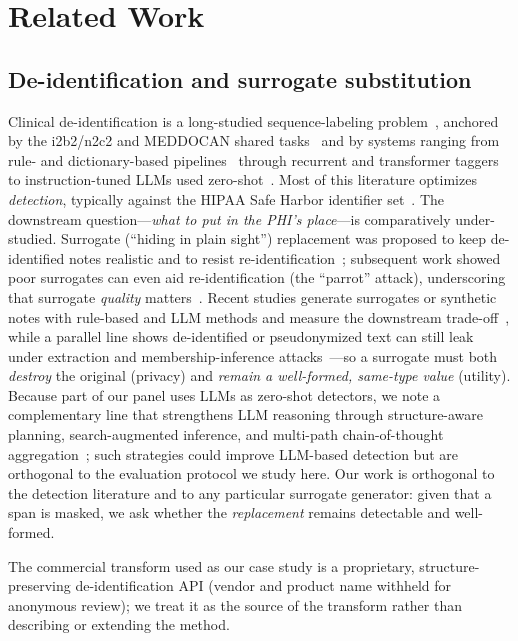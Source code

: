 \documentclass[pmlr,twocolumn,10pt]{jmlr}
\begin{document}
\section{Related Work}
\subsection{De-identification and surrogate substitution}
Clinical de-identification is a long-studied sequence-labeling problem~\citep{uzuner2007evaluating}, anchored by the i2b2/n2c2 and MEDDOCAN shared tasks~\citep{stubbs2015i2b2,marimon2019meddocan} and by systems ranging from rule- and dictionary-based pipelines~\citep{presidio} through recurrent and transformer taggers~\citep{dernoncourt2017deid,liu2017deid,johnson2020deid} to instruction-tuned LLMs used zero-shot~\citep{liu2023deidgpt}. Most of this literature optimizes \emph{detection}, typically against the HIPAA Safe Harbor identifier set~\citep{hhs2012safeharbor}. The downstream question---\emph{what to put in the PHI's place}---is comparatively under-studied. Surrogate (``hiding in plain sight'') replacement was proposed to keep de-identified notes realistic and to resist re-identification~\citep{carrell2013hiding}; subsequent work showed poor surrogates can even aid re-identification (the ``parrot'' attack), underscoring that surrogate \emph{quality} matters~\citep{carrell2020parrot}. Recent studies generate surrogates or synthetic notes with rule-based and LLM methods and measure the downstream trade-off~\citep{yermilov2023privacy,kim2024generalizing}, while a parallel line shows de-identified or pseudonymized text can still leak under extraction and membership-inference attacks~\citep{carlini2021extracting,lehman2021bert,sarkar2024deid}---so a surrogate must both \emph{destroy} the original (privacy) and \emph{remain a well-formed, same-type value} (utility). Because part of our panel uses LLMs as zero-shot detectors, we note a complementary line that strengthens LLM reasoning through structure-aware planning, search-augmented inference, and multi-path chain-of-thought aggregation~\citep{xiong2025deliberate,xiong2026enhancing,xiong2026adaptive,xiong2025enhancing}; such strategies could improve LLM-based detection but are orthogonal to the evaluation protocol we study here. Our work is orthogonal to the detection literature and to any particular surrogate generator: given that a span is masked, we ask whether the \emph{replacement} remains detectable and well-formed.

The commercial transform used as our case study is a proprietary, structure-preserving de-identification API (vendor and product name withheld for anonymous review); we treat it as the source of the transform rather than describing or extending the method.
\end{document}
